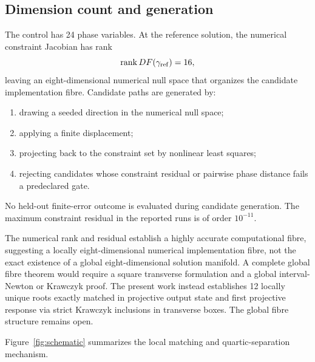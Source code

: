 \subsection{Dimension count and generation}

The control has 24 phase variables. At the reference solution, the numerical constraint
Jacobian has rank
\[
\operatorname{rank} DF(\gamma_{\mathrm{ref}})=16,
\]
leaving an eight-dimensional numerical null space that organizes the candidate
implementation fibre. Candidate paths are generated by:
\begin{enumerate}[itemsep=0.1em]
\item drawing a seeded direction in the numerical null space;
\item applying a finite displacement;
\item projecting back to the constraint set by nonlinear least squares;
\item rejecting candidates whose constraint residual or pairwise phase distance fails a
predeclared gate.
\end{enumerate}
No held-out finite-error outcome is evaluated during candidate generation. The maximum
constraint residual in the reported runs is of order $10^{-11}$.

\begin{remark}\label{rem:globalfibre}
The numerical rank and residual establish a highly accurate computational fibre, suggesting
a locally eight-dimensional numerical implementation fibre, not the exact existence of a
global eight-dimensional solution manifold. A complete global fibre theorem would require a
square transverse formulation and a global interval-Newton or Krawczyk proof. The present
work instead establishes 12 locally unique roots exactly matched in projective output state
and first projective response via strict Krawczyk inclusions in transverse boxes. The
global fibre structure remains open.
\end{remark}

Figure~\ref{fig:schematic} summarizes the local matching and quartic-separation
mechanism.

